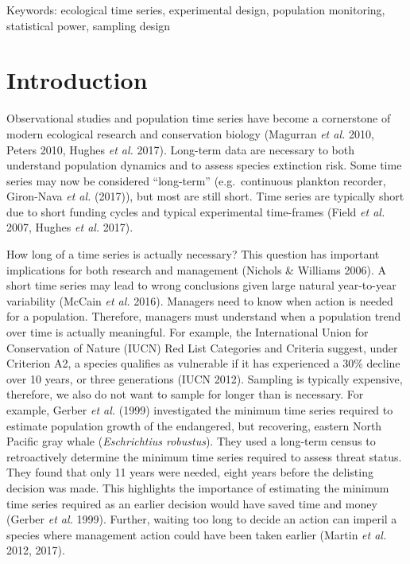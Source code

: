 \documentclass[12pt,]{article}
\begin{document}
Keywords: ecological time series, experimental design, population
monitoring, statistical power, sampling design

\section{Introduction}\label{introduction}

Observational studies and population time series have become a
cornerstone of modern ecological research and conservation biology
(Magurran \emph{et al.} 2010, Peters 2010, Hughes \emph{et al.} 2017).
Long-term data are necessary to both understand population dynamics and
to assess species extinction risk. Some time series may now be
considered ``long-term'' (e.g.~continuous plankton recorder, Giron-Nava
\emph{et al.} (2017)), but most are still short. Time series are
typically short due to short funding cycles and typical experimental
time-frames (Field \emph{et al.} 2007, Hughes \emph{et al.} 2017).

How long of a time series is actually necessary? This question has
important implications for both research and management (Nichols \&
Williams 2006). A short time series may lead to wrong conclusions given
large natural year-to-year variability (McCain \emph{et al.} 2016).
Managers need to know when action is needed for a population. Therefore,
managers must understand when a population trend over time is actually
meaningful. For example, the International Union for Conservation of
Nature (IUCN) Red List Categories and Criteria suggest, under Criterion
A2, a species qualifies as vulnerable if it has experienced a 30\%
decline over 10 years, or three generations (IUCN 2012). Sampling is
typically expensive, therefore, we also do not want to sample for longer
than is necessary. For example, Gerber \emph{et al.} (1999) investigated
the minimum time series required to estimate population growth of the
endangered, but recovering, eastern North Pacific gray whale
(\emph{Eschrichtius robustus}). They used a long-term census to
retroactively determine the minimum time series required to assess
threat status. They found that only 11 years were needed, eight years
before the delisting decision was made. This highlights the importance
of estimating the minimum time series required as an earlier decision
would have saved time and money (Gerber \emph{et al.} 1999). Further,
waiting too long to decide an action can imperil a species where
management action could have been taken earlier (Martin \emph{et al.}
2012, 2017).
\end{document}
